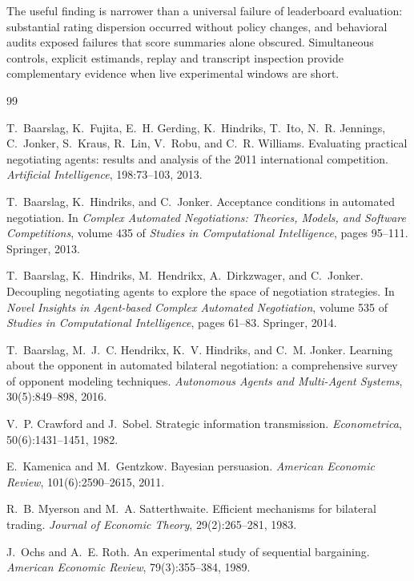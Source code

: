 \documentclass{article}
\begin{document}
The useful finding is narrower than a universal failure of leaderboard
evaluation: substantial rating dispersion occurred without policy changes,
and behavioral audits exposed failures that score summaries alone obscured.
Simultaneous controls, explicit estimands, replay and transcript inspection
provide complementary evidence when live experimental windows are short.
\label{endmain}


\clearpage

\begin{thebibliography}{99}\small

T.~Baarslag, K.~Fujita, E.~H. Gerding, K.~Hindriks, T.~Ito, N.~R. Jennings,
C.~Jonker, S.~Kraus, R.~Lin, V.~Robu, and C.~R. Williams.
Evaluating practical negotiating agents: results and analysis of the 2011
international competition.
\emph{Artificial Intelligence}, 198:73--103, 2013.

T.~Baarslag, K.~Hindriks, and C.~Jonker. Acceptance conditions in automated
negotiation. In \emph{Complex Automated Negotiations: Theories, Models, and
Software Competitions}, volume 435 of \emph{Studies in Computational
Intelligence}, pages 95--111. Springer, 2013.

T.~Baarslag, K.~Hindriks, M.~Hendrikx, A.~Dirkzwager, and C.~Jonker.
Decoupling negotiating agents to explore the space of negotiation strategies.
In \emph{Novel Insights in Agent-based Complex Automated Negotiation}, volume
535 of \emph{Studies in Computational Intelligence}, pages 61--83. Springer,
2014.

T.~Baarslag, M.~J.~C. Hendrikx, K.~V. Hindriks, and C.~M. Jonker.
Learning about the opponent in automated bilateral negotiation: a comprehensive
survey of opponent modeling techniques.
\emph{Autonomous Agents and Multi-Agent Systems}, 30(5):849--898, 2016.

V.~P. Crawford and J.~Sobel. Strategic information transmission.
\emph{Econometrica}, 50(6):1431--1451, 1982.

E.~Kamenica and M.~Gentzkow. Bayesian persuasion.
\emph{American Economic Review}, 101(6):2590--2615, 2011.

R.~B. Myerson and M.~A. Satterthwaite. Efficient mechanisms for bilateral trading.
\emph{Journal of Economic Theory}, 29(2):265--281, 1983.

J.~Ochs and A.~E. Roth. An experimental study of sequential bargaining.
\emph{American Economic Review}, 79(3):355--384, 1989.


\end{thebibliography}
\end{document}

